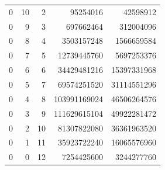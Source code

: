 \begin{longtable}{rrr|rr}
0&10&2&95254016&42598912\\
0&9&3&697662464&312004096\\
0&8&4&3503157248&1566659584\\
0&7&5&12739445760&5697253376\\
0&6&6&34429481216&15397331968\\
0&5&7&69574251520&31114551296\\
0&4&8&103991169024&46506264576\\
0&3&9&111629615104&49922281472\\
0&2&10&81307822080&36361963520\\
0&1&11&35923722240&16065576960\\
0&0&12&7254425600&3244277760\\
\end{longtable}
